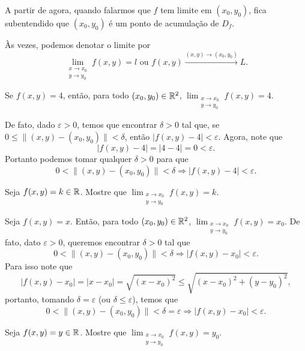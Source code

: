 A partir de agora, quando falarmos que \(f\) tem limite em \((x_0,y_0)\), fica subentendido que \((x_0,y_0)\) é um ponto de acumulação de \(D_f\).

Às vezes, podemos denotar o limite por \[\lim_{\substack{x\to x_0 \\ y\to y_0}} f(x,y) = l \text{ ou } f(x,y) \xrightarrow{(x,y) \to (x_0,y_0)} L.\]

\begin{example}
    Se \(f(x,y) = 4\), então, para todo \((x_0,y_0)\in\mathbb{R}^2\), \(\displaystyle\lim_{\substack{x\to x_0 \\ y\to y_0}} f(x,y) = 4\).

    De fato, dado \(\varepsilon>0\), temos que encontrar \(\delta>0\) tal que, se \(0\leq \|(x,y)-(x_0,y_0)\| < \delta\), então \(|f(x,y) - 4| < \varepsilon\). Agora, note que \[|f(x,y) - 4| = |4 - 4| = 0 < \varepsilon.\] Portanto podemos tomar qualquer \(\delta>0\) para que \[0<\|(x,y) - (x_0,y_0)\|<\delta \Rightarrow |f(x,y) - 4| < \varepsilon.\]
\end{example}

\begin{exercise}
    Seja \(f(x,y) = k\in\mathbb{R}\). Mostre que \(\displaystyle\lim_{\substack{x\to x_0 \\ y\to y_0}} f(x,y) = k\).
\end{exercise}

\begin{example}
    Seja \(f(x,y) = x\). Então, para todo \((x_0,y_0)\in\mathbb{R}^2\), \(\displaystyle\lim_{\substack{x\to x_0 \\ y\to y_0}} f(x,y) = x_0\). De fato, dato \(\varepsilon>0\), queremos encontrar \(\delta>0\) tal que \[0<\|(x,y) - (x_0,y_0)\| < \delta \Rightarrow |f(x,y) - x_0| < \varepsilon.\] Para isso note que \[|f(x,y) - x_0| = |x - x_0| = \sqrt{(x-x_0)^2} \leq \sqrt{(x-x_0)^2 + (y-y_0)^2},\] portanto, tomando \(\delta = \varepsilon\) (ou \(\delta\leq \varepsilon\)), temos que \[0 < \|(x,y) - (x_0,y_0)\| < \delta = \varepsilon \Rightarrow |f(x,y) - x_0| < \varepsilon.\]
\end{example}

\begin{exercise}
    Seja \(f(x,y) = y\in\mathbb{R}\). Mostre que \(\displaystyle\lim_{\substack{x\to x_0 \\ y\to y_0}} f(x,y) = y_0\).
\end{exercise}

